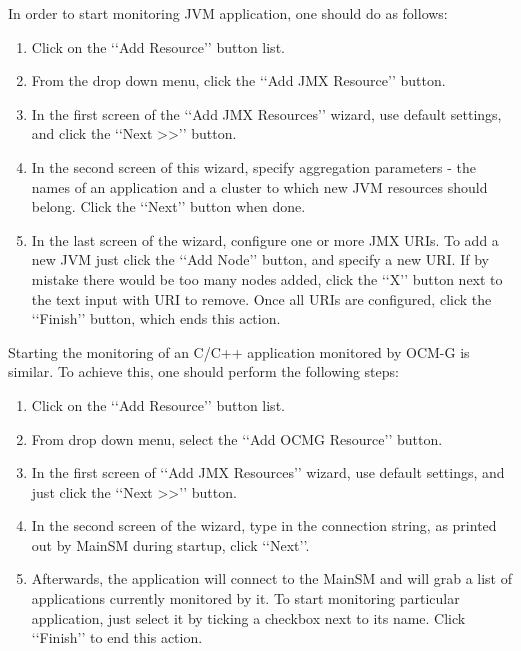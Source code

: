 In order to start monitoring JVM application, one should do as follows:

\begin{enumerate}

\item Click on the \lq\lq{}Add Resource\rq\rq{} button list. 

\item From the drop down menu, click the \lq\lq{}Add JMX Resource\rq\rq{} button.

\item In the first screen of the \lq\lq{}Add JMX Resources\rq\rq{} wizard, use default settings, and click the \lq\lq{}Next >>\rq\rq{} button.

\item In the second screen of this wizard, specify aggregation parameters - the names of an application and a cluster to which new JVM resources should belong. Click the \lq\lq{}Next\rq\rq{} button when done.

\item In the last screen of the wizard, configure one or more JMX URIs. To add a new JVM just click the \lq\lq{}Add Node\rq\rq{} button, and specify a new URI. If by mistake there would be too many nodes added, click the \lq\lq{}X\rq\rq{} button next to the text input with URI to remove. Once all URIs are configured, click the \lq\lq{}Finish\rq\rq{} button, which ends this action.

\end{enumerate}

Starting the monitoring of an C/C++ application monitored by OCM-G is  similar. To achieve this, one should perform the following steps:

\begin{enumerate}

\item Click on the \lq\lq{}Add Resource\rq\rq{} button list.

\item From drop down menu, select the \lq\lq{}Add OCMG Resource\rq\rq{} button.

\item In the first screen of \lq\lq{}Add JMX Resources\rq\rq{} wizard, use default settings, and just click the \lq\lq{}Next >>\rq\rq{} button.

\item In the second screen of the wizard, type in the connection string, as printed out by MainSM during startup, click \lq\lq{}Next\rq\rq{}.

\item Afterwards, the application will connect to the MainSM and will grab a list of applications currently monitored by it. To start monitoring particular application, just select it by ticking a checkbox next to its name. Click \lq\lq{}Finish\rq\rq{} to end this action.

\end{enumerate}

